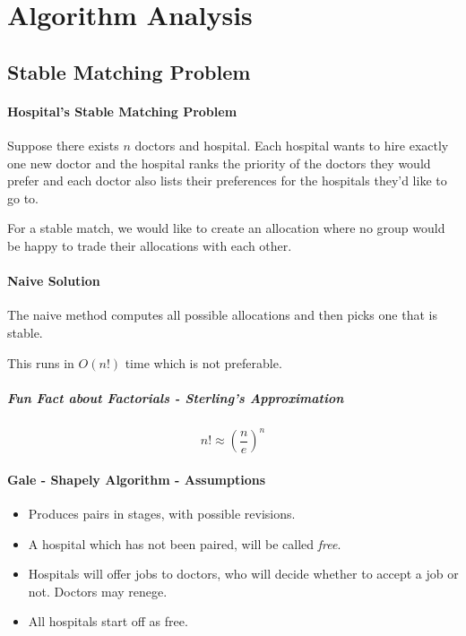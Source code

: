 \section{Algorithm Analysis}

\subsection{Stable Matching Problem}

\paragraph{Hospital's Stable Matching Problem}
Suppose there exists \(n\) doctors and hospital. Each hospital wants to
hire exactly one new doctor and the hospital ranks the priority of the
doctors they would prefer and each doctor also lists their preferences for
the hospitals they'd like to go to.

For a stable match, we would like to create an allocation where no group
would be happy to trade their allocations with each other.

\paragraph{Naive Solution}
The naive method computes all possible allocations and then picks one that
is stable.

This runs in \(O(n!)\) time which is not preferable.

\subparagraph{Fun Fact about Factorials - Sterling's Approximation}
\[n! \approx \left(\frac{n}{e}\right)^n\]

\paragraph{Gale - Shapely Algorithm - Assumptions}
\begin{itemize}
    \item Produces pairs in stages, with possible revisions.
    \item A hospital which has not been paired, will be called \textit{free}.
    \item Hospitals will offer jobs to doctors, who will decide whether to
    accept a job or not. Doctors may renege.
    \item All hospitals start off as free.
\end{itemize}

